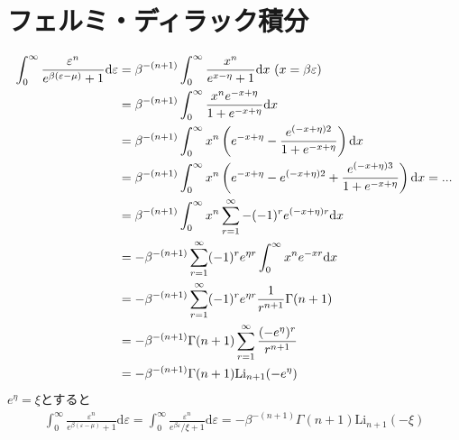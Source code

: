 \documentclass[11pt,a4j,notitlepage]{jreport}
\begin{document}
\chapter{フェルミ・ディラック積分}
\begin{align}
 	\int_{0}^{\infty} \frac{\varepsilon^{n}}{e^{\beta(\varepsilon-\mu)}+1} \mathrm{d} \varepsilon
	& = \beta^{ -( n+1 ) } \int_{0}^{\infty} \frac{ x^{n} }{ e^{ x - \eta } + 1 } \mathrm{d} x \  (x=\beta \varepsilon)
	\notag \\
 	& = \beta^{ -( n+1 ) } \int_{0}^{\infty} \frac{ x^{n}  e^{ - x + \eta } }{ 1 + e^{ - x + \eta } } \mathrm{d} x
 	\notag \\
 	& = \beta^{ -( n+1 ) } \int_{0}^{\infty} x^{n} \left( e^{ - x + \eta } - \frac{ e^{ (- x + \eta)2 } }{ 1 + e^{ - x + \eta } } \right) \mathrm{d} x
 	\notag \\
 	& = \beta^{ -( n+1 ) } \int_{0}^{\infty} x^{n} \left( e^{ - x + \eta } -  e^{ (- x + \eta)2 } + \frac{ e^{ (- x + \eta)3 } }{ 1 + e^{ - x + \eta } } \right) \mathrm{d} x = ...
 	\notag \\
 	& = \beta^{ -( n+1 ) } \int_{0}^{\infty} x^{n} \sum_{r=1}^{\infty} - (-1)^r e^{ (- x + \eta)r } \mathrm{d} x
 	\notag \\
 	& = - \beta^{ -( n+1 ) } \sum_{r=1}^{\infty} (-1)^r e^{ \eta r } \int_{0}^{\infty} x^{n} e^{ - x r } \mathrm{d} x
 	\notag \\
 	& = - \beta^{ -( n+1 ) } \sum_{r=1}^{\infty} (-1)^r e^{ \eta r } \frac{1}{r^{n+1}}\Gamma(n+1)
 	\notag \\
 	& = - \beta^{ -( n+1 ) } \Gamma(n+1) \sum_{r=1}^{\infty} \frac{ (- e^{ \eta })^r}{ r^{n+1} }
 	\notag \\
 	& = - \beta^{ -( n+1 ) } \Gamma(n+1) \mathrm{Li}_{n+1}(- e^{ \eta })
	\label{eq:1}
\end{align}
$e^{ \eta }=\xi$とすると
\begin{align}
 	\int_{0}^{\infty} \frac{\varepsilon^{n}}{e^{\beta(\varepsilon-\mu)}+1} \mathrm{d} \varepsilon
 	= \int_{0}^{\infty} \frac{\varepsilon^{n}}{e^{\beta \varepsilon }/\xi +1} \mathrm{d} \varepsilon
 	= - \beta^{ -( n+1 ) } \Gamma(n+1) \mathrm{Li}_{n+1}(- \xi )
	\label{eq:2}
\end{align}
\end{document}
